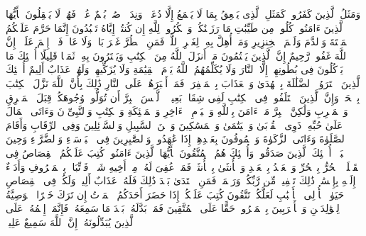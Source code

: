 \stopbuffer%
\startbuffer[\q:2:171]
وَمَثَلُ ٱلَّذِینَ كَفَرُوا۟ كَمَثَلِ ٱلَّذِی یَنۡعِقُ بِمَا لَا یَسۡمَعُ إِلَّا دُعَاۤءࣰ وَنِدَاۤءࣰۚ صُمُّۢ بُكۡمٌ عُمۡیࣱ فَهُمۡ لَا یَعۡقِلُونَ%
\stopbuffer%
\startbuffer[\q:2:172]
یَٰۤأَیُّهَا ٱلَّذِینَ ءَامَنُوا۟ كُلُوا۟ مِن طَیِّبَٰتِ مَا رَزَقۡنَٰكُمۡ وَٱشۡكُرُوا۟ لِلَّهِ إِن كُنتُمۡ إِیَّاهُ تَعۡبُدُونَ%
\stopbuffer%
\startbuffer[\q:2:173]
إِنَّمَا حَرَّمَ عَلَیۡكُمُ ٱلۡمَیۡتَةَ وَٱلدَّمَ وَلَحۡمَ ٱلۡخِنزِیرِ وَمَاۤ أُهِلَّ بِهِۦ لِغَیۡرِ ٱللَّهِۖ فَمَنِ ٱضۡطُرَّ غَیۡرَ بَاغࣲ وَلَا عَادࣲ فَلَاۤ إِثۡمَ عَلَیۡهِۚ إِنَّ ٱللَّهَ غَفُورࣱ رَّحِیمٌ%
\stopbuffer%
\startbuffer[\q:2:174]
إِنَّ ٱلَّذِینَ یَكۡتُمُونَ مَاۤ أَنزَلَ ٱللَّهُ مِنَ ٱلۡكِتَٰبِ وَیَشۡتَرُونَ بِهِۦ ثَمَنࣰا قَلِیلًا أُو۟لَٰۤئِكَ مَا یَأۡكُلُونَ فِی بُطُونِهِمۡ إِلَّا ٱلنَّارَ وَلَا یُكَلِّمُهُمُ ٱللَّهُ یَوۡمَ ٱلۡقِیَٰمَةِ وَلَا یُزَكِّیهِمۡ وَلَهُمۡ عَذَابٌ أَلِیمٌ%
\stopbuffer%
\startbuffer[\q:2:175]
أُو۟لَٰۤئِكَ ٱلَّذِینَ ٱشۡتَرَوُا۟ ٱلضَّلَٰلَةَ بِٱلۡهُدَىٰ وَٱلۡعَذَابَ بِٱلۡمَغۡفِرَةِۚ فَمَاۤ أَصۡبَرَهُمۡ عَلَى ٱلنَّارِ%
\stopbuffer%
\startbuffer[\q:2:176]
ذَٰلِكَ بِأَنَّ ٱللَّهَ نَزَّلَ ٱلۡكِتَٰبَ بِٱلۡحَقِّۗ وَإِنَّ ٱلَّذِینَ ٱخۡتَلَفُوا۟ فِی ٱلۡكِتَٰبِ لَفِی شِقَاقِۭ بَعِیدࣲ%
\stopbuffer%
\startbuffer[\q:2:177]
۞ لَّیۡسَ ٱلۡبِرَّ أَن تُوَلُّوا۟ وُجُوهَكُمۡ قِبَلَ ٱلۡمَشۡرِقِ وَٱلۡمَغۡرِبِ وَلَٰكِنَّ ٱلۡبِرَّ مَنۡ ءَامَنَ بِٱللَّهِ وَٱلۡیَوۡمِ ٱلۡءَاخِرِ وَٱلۡمَلَٰۤئِكَةِ وَٱلۡكِتَٰبِ وَٱلنَّبِیِّۦنَ وَءَاتَى ٱلۡمَالَ عَلَىٰ حُبِّهِۦ ذَوِی ٱلۡقُرۡبَىٰ وَٱلۡیَتَٰمَىٰ وَٱلۡمَسَٰكِینَ وَٱبۡنَ ٱلسَّبِیلِ وَٱلسَّاۤئِلِینَ وَفِی ٱلرِّقَابِ وَأَقَامَ ٱلصَّلَوٰةَ وَءَاتَى ٱلزَّكَوٰةَ وَٱلۡمُوفُونَ بِعَهۡدِهِمۡ إِذَا عَٰهَدُوا۟ۖ وَٱلصَّٰبِرِینَ فِی ٱلۡبَأۡسَاۤءِ وَٱلضَّرَّاۤءِ وَحِینَ ٱلۡبَأۡسِۗ أُو۟لَٰۤئِكَ ٱلَّذِینَ صَدَقُوا۟ۖ وَأُو۟لَٰۤئِكَ هُمُ ٱلۡمُتَّقُونَ%
\stopbuffer%
\startbuffer[\q:2:178]
یَٰۤأَیُّهَا ٱلَّذِینَ ءَامَنُوا۟ كُتِبَ عَلَیۡكُمُ ٱلۡقِصَاصُ فِی ٱلۡقَتۡلَىۖ ٱلۡحُرُّ بِٱلۡحُرِّ وَٱلۡعَبۡدُ بِٱلۡعَبۡدِ وَٱلۡأُنثَىٰ بِٱلۡأُنثَىٰۚ فَمَنۡ عُفِیَ لَهُۥ مِنۡ أَخِیهِ شَیۡءࣱ فَٱتِّبَاعُۢ بِٱلۡمَعۡرُوفِ وَأَدَاۤءٌ إِلَیۡهِ بِإِحۡسَٰنࣲۗ ذَٰلِكَ تَخۡفِیفࣱ مِّن رَّبِّكُمۡ وَرَحۡمَةࣱۗ فَمَنِ ٱعۡتَدَىٰ بَعۡدَ ذَٰلِكَ فَلَهُۥ عَذَابٌ أَلِیمࣱ%
\stopbuffer%
\startbuffer[\q:2:179]
وَلَكُمۡ فِی ٱلۡقِصَاصِ حَیَوٰةࣱ یَٰۤأُو۟لِی ٱلۡأَلۡبَٰبِ لَعَلَّكُمۡ تَتَّقُونَ%
\stopbuffer%
\startbuffer[\q:2:180]
كُتِبَ عَلَیۡكُمۡ إِذَا حَضَرَ أَحَدَكُمُ ٱلۡمَوۡتُ إِن تَرَكَ خَیۡرًا ٱلۡوَصِیَّةُ لِلۡوَٰلِدَیۡنِ وَٱلۡأَقۡرَبِینَ بِٱلۡمَعۡرُوفِۖ حَقًّا عَلَى ٱلۡمُتَّقِینَ%
\stopbuffer%
\startbuffer[\q:2:181]
فَمَنۢ بَدَّلَهُۥ بَعۡدَ مَا سَمِعَهُۥ فَإِنَّمَاۤ إِثۡمُهُۥ عَلَى ٱلَّذِینَ یُبَدِّلُونَهُۥۤۚ إِنَّ ٱللَّهَ سَمِیعٌ عَلِیمࣱ%
